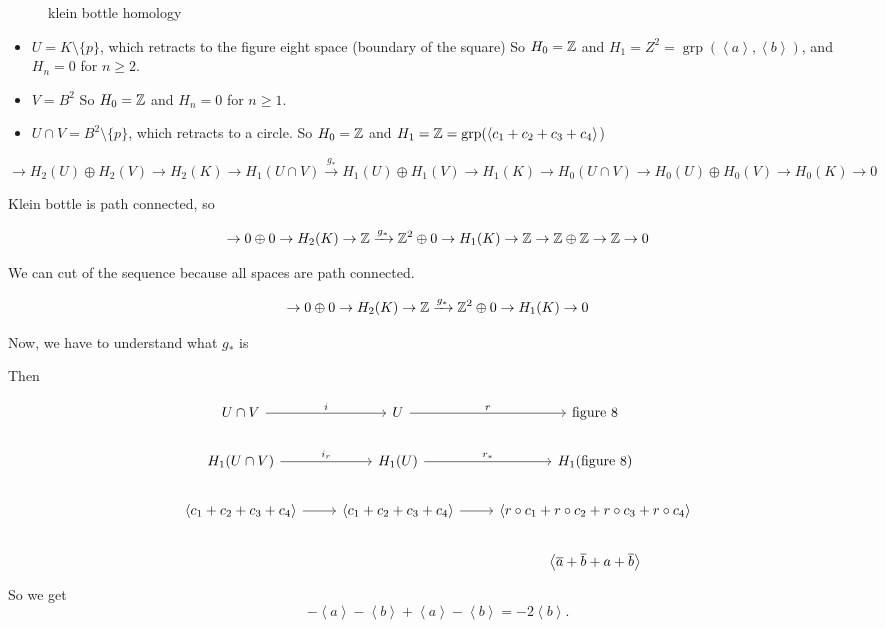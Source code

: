 \begin{figure}[H]
    \centering
    \caption{klein bottle homology}
    \label{fig:klein-bottle-homology}
\end{figure}

\begin{itemize}
    \item $U = K \setminus \{p\}$, which retracts to the figure eight space (boundary of the square)
        So $H_0 = \mathbb{Z}$ and $H_1  = Z^2 = \operatorname{grp}(\left<a \right>, \left<b \right>)$, and $H_n =0$ for  $n \ge  2$.
    \item $V = B^2$
        So $H_0 = \mathbb{Z}$ and $H_n = 0$ for  $n \ge 1 $.
    \item $U \cap V = B^2 \setminus \{p\}$, which retracts to a circle.
        So $H_0 = \mathbb{Z}$ and $H_1 = \mathbb{Z} = \operatorname{grp}(\left<c_1 + c_2 + c_3 + c_4\right>$)
\end{itemize}

\centerline{$
            \to  H_2(U) \oplus H_2(V) \to  H_2(K) \to  H_1(U \cap V) \xrightarrow{g_*}   H_1(U) \oplus H_1(V) \to  H_1(K) \to  H_0(U \cap  V) \to  H_0(U) \oplus H_0(V) \to  H_0(K) \to  0
        $}

        Klein bottle is path connected,  so

        \[
                    \to  0 \oplus 0 \to  H_2(K) \to  \mathbb{Z} \xrightarrow{g_*}   \mathbb{Z}^2\oplus 0 \to  H_1(K) \to  \mathbb{Z} \to  \mathbb{Z}  \oplus \mathbb{Z} \to  \mathbb{Z} \to  0
        \]

        We can cut of the sequence  because all spaces are path connected.

        \[
                    \to  0 \oplus 0 \to  H_2(K) \to  \mathbb{Z} \xrightarrow{g_*}   \mathbb{Z}^2\oplus 0 \to  H_1(K) \to  0
        \]

        Now, we have to understand what $g_*$ is

        Then

        \[
            \begin{tikzcd}
                U \cap V \arrow[r, "i"] & U \arrow[r, "r"] & \text{figure 8}\\
                H_1(U \cap V) \arrow[r, "i_r"] & H_1(U) \arrow[r, "r_*"] & H_1(\text{figure 8})\\
                \left<c_1 + c_2 + c_3 + c_4 \right> \arrow[r, ""] & \left<c_1+ c_2 +c_3 +c_4 \right> \arrow[r, ""] & \left<r  \circ  c_1 + r  \circ  c_2 + r  \circ  c_3 + r  \circ  c_4 \right>\\
                                      && \left<\overline{a} + \overline{b} + a + \overline{b} \right>
            \end{tikzcd}
        \]
        So we get
        \[
        - \left<a \right> - \left<b \right> + \left<a \right> - \left<b \right> = - 2 \left<b \right>
        .\] 

